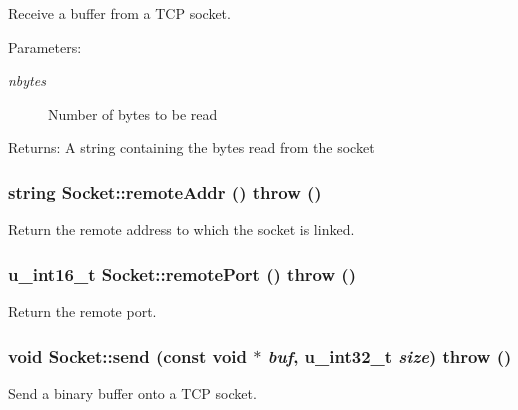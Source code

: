 Receive a buffer from a TCP socket. 

\begin{Desc}
\item[Parameters:]
\begin{description}
\item[{\em nbytes}]Number of bytes to be read \end{description}
\end{Desc}
\begin{Desc}
\item[Returns:]A string containing the bytes read from the socket \end{Desc}
\hypertarget{classSocket_242310b19dfd0a252d3bf106512bd569}{
\subsubsection[{remoteAddr}]{\setlength{\rightskip}{0pt plus 5cm}string Socket::remoteAddr ()  throw ()}}
\label{classSocket_242310b19dfd0a252d3bf106512bd569}


Return the remote address to which the socket is linked. 

\hypertarget{classSocket_7cb1ce737346cbc92f7d1cc3d9578d38}{
\subsubsection[{remotePort}]{\setlength{\rightskip}{0pt plus 5cm}u\_\-int16\_\-t Socket::remotePort ()  throw ()}}
\label{classSocket_7cb1ce737346cbc92f7d1cc3d9578d38}


Return the remote port. 

\hypertarget{classSocket_e19472a87361143b4e3e2730e69b5955}{
\subsubsection[{send}]{\setlength{\rightskip}{0pt plus 5cm}void Socket::send (const void $\ast$ {\em buf}, \/  u\_\-int32\_\-t {\em size})  throw ()}}
\label{classSocket_e19472a87361143b4e3e2730e69b5955}


Send a binary buffer onto a TCP socket. 


